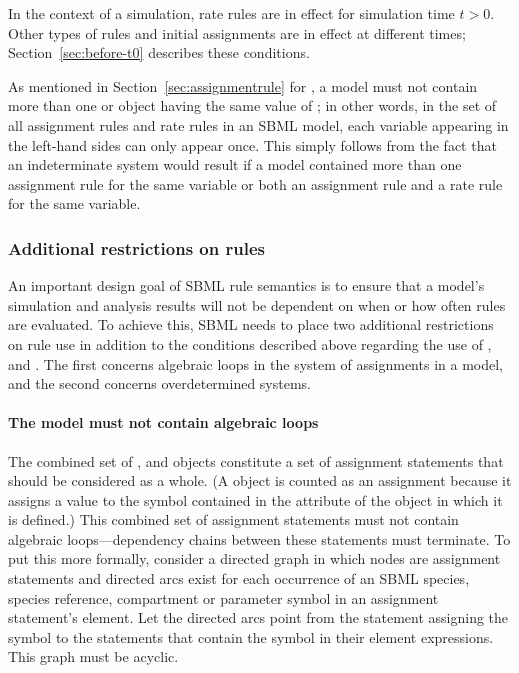 In the context of a simulation, rate rules are in effect for
simulation time $t > 0$.  Other types of rules and initial
assignments are in effect at different times;
Section~\ref{sec:before-t0} describes these conditions.

As mentioned in Section~\ref{sec:assignmentrule} for
\AssignmentRule, a model must not contain more than one \RateRule
or \AssignmentRule object having the same value of
; in other words, in the set of all assignment
rules and rate rules in an SBML model, each variable appearing in
the left-hand sides can only appear once.  This simply follows
from the fact that an indeterminate system would result if a model
contained more than one assignment rule for the same variable or
both an assignment rule and a rate rule for the same variable.


\subsubsection{Additional restrictions on rules}
\label{sec:ruleconstraints}

An important design goal of SBML rule semantics is to ensure that
a model's simulation and analysis results will not be dependent on
when or how often rules are evaluated.  To achieve this, SBML
needs to place two additional restrictions on rule use in addition
to the conditions described above regarding the use of
\AlgebraicRule, \AssignmentRule and \RateRule.  The first concerns
algebraic loops in the system of assignments in a model, and the
second concerns overdetermined systems.


\paragraph{The model must not contain algebraic loops}

The combined set of \InitialAssignment, \AssignmentRule and
\KineticLaw objects constitute a set of assignment statements that
should be considered as a whole.  (A \KineticLaw object is counted
as an assignment because it assigns a value to the symbol
contained in the  attribute of the \Reaction object in which
it is defined.)  This combined set of assignment statements must
not contain algebraic loops---dependency chains between these
statements must terminate.  To put this more formally, consider a
directed graph in which nodes are assignment statements and
directed arcs exist for each occurrence of an SBML species, species reference,
compartment or parameter symbol in an assignment statement's
 element.  Let the directed arcs point from the
statement assigning the symbol to the statements that contain the
symbol in their  element expressions.  This graph must
be acyclic.

